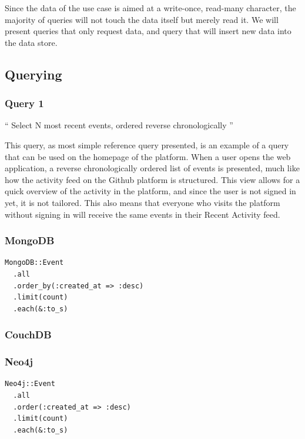 Since the data of the use case is aimed at a write-once, read-many character, the majority of queries will not touch the data itself but merely read it.
We will present  queries that only request data, and  query that will insert new data into the data store.

\subsection{Querying}
\label{subsec:querying}

\subsubsection{Query 1}
\label{subsubsec:query-1}

``
Select N most recent events, ordered reverse chronologically
''

This query, as most simple reference query presented, is an example of a query that can be used on the homepage of the platform.
When a user opens the web application, a reverse chronologically ordered list of events is presented, much like how the activity feed on the Github platform is structured.
This view allows for a quick overview of the activity in the platform, and since the user is not signed in yet, it is not tailored.
This also means that everyone who visits the platform without signing in will receive the same events in their Recent Activity feed.

\subsubsection*{MongoDB}

\begin{verbatim}
MongoDB::Event
  .all
  .order_by(:created_at => :desc)
  .limit(count)
  .each(&:to_s)
\end{verbatim}

\subsubsection*{CouchDB}


\subsubsection*{Neo4j}

\begin{verbatim}
Neo4j::Event
  .all
  .order(:created_at => :desc)
  .limit(count)
  .each(&:to_s)
\end{verbatim}

